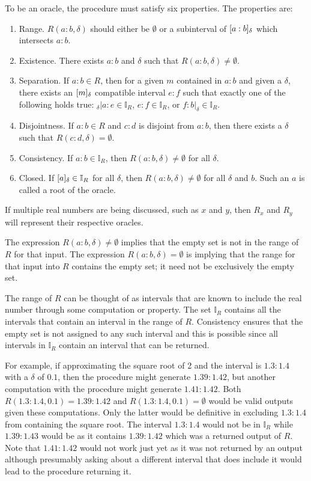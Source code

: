 \documentclass[12pt]{article}
\begin{document}
To be an oracle, the procedure must satisfy six properties.  The properties are:
\begin{enumerate}
    \item Range. 
    $R(a:b, \delta)$ should either be $\emptyset$ or a subinterval of $[a:b]_{\delta}$ which intersects $a:b$. 
    \item Existence. 
    There exists $a:b$ and $\delta$ such that $R(a:b, \delta) \neq \emptyset$.
    \item Separation. 
    If $a:b \in R$, then for a given $m$ contained in $a:b$ and given a $\delta$, there exists an $[m]_{\delta}$ compatible interval $e:f$ such that exactly one of the following holds true:  ${}_\delta |a:e \in \mathbb{I}_R$, $e:f \in \mathbb{I}_R$,  or $f:b|_\delta \in \mathbb{I}_R$.
   \item Disjointness. 
   If $a:b \in R$ and $c:d$ is disjoint from $a:b$, then there exists a $\delta$ such that $R(c:d, \delta) = \emptyset$.
    \item Consistency. 
    If $a:b  \in \mathbb{I}_R$, then $R(a:b, \delta) \neq \emptyset$ for all $\delta$.
    \item Closed. 
    If $[a]_{\delta} \in \mathbb{I}_R$ for all $\delta $, then $R(a:b, \delta) \neq \emptyset$ for all $\delta$ and $b$. Such an $a$ is called a root of the oracle. 
\end{enumerate}

If multiple real numbers are being discussed, such as $x$ and $y$, then $R_x$ and $R_y$ will represent their respective oracles. 

The expression $R(a:b, \delta) \neq \emptyset$ implies that the empty set is not in the range of $R$ for that input. The expression $R(a:b, \delta) = \emptyset$ is implying that the range for that input into $R$ contains the empty set; it need not be exclusively the empty set.

The range of $R$ can be thought of as intervals that are known to include the real number through some computation or property. The set $\mathbb{I}_R$ contains all the intervals that contain an interval in the range of $R$. Consistency ensures that the empty set is not assigned to any such interval and this is possible since all intervals in $\mathbb{I}_R$ contain an interval that can be returned. 

 For example, if approximating the square root of 2 and the interval is $1.3:1.4$ with a $\delta$ of $0.1$, then the procedure might generate $1.39:1.42$, but another computation with the procedure might generate $1.41:1.42$. Both $R(1.3:1.4, 0.1) = 1.39:1.42$ and $R(1.3:1.4, 0.1) = \emptyset$ would be valid outputs given these computations. Only the latter would be definitive in excluding $1.3:1.4$ from containing the square root. The interval $1.3:1.4$ would not be in $\mathbb{I}_R$ while $1.39:1.43$ would be as it contains $1.39:1.42$ which was a returned output of $R$. Note that $1.41:1.42$ would not work just yet as it was not returned by an output although presumably asking about a different interval that does include it would lead to the procedure returning it. 
\end{document}
